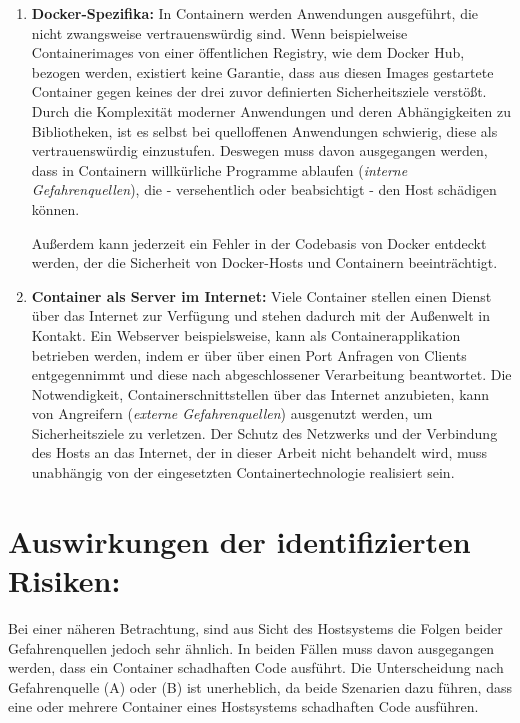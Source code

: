 \documentclass[../main.tex]{subfiles}
\begin{document}
    \begin{enumerate}[label=(\Alph*)]
      \item \textbf{Docker-Spezifika:} In Containern werden Anwendungen ausgeführt, die nicht zwangsweise vertrauenswürdig sind. Wenn beispielweise Containerimages von einer öffentlichen Registry, wie dem Docker Hub, bezogen werden, existiert keine Garantie, dass aus diesen Images gestartete Container gegen keines der drei zuvor definierten Sicherheitsziele verstößt. Durch die Komplexität moderner Anwendungen und deren Abhängigkeiten zu Bibliotheken, ist es selbst bei quelloffenen Anwendungen schwierig, diese als vertrauenswürdig einzustufen. Deswegen muss davon ausgegangen werden, dass in Containern willkürliche Programme ablaufen (\emph{interne Gefahrenquellen}), die - versehentlich oder beabsichtigt - den Host schädigen können.

      Außerdem kann jederzeit ein Fehler in der Codebasis von Docker entdeckt werden, der die Sicherheit von Docker-Hosts und Containern beeinträchtigt.

      \item \textbf{Container als Server im Internet:} Viele Container stellen einen Dienst über das Internet zur Verfügung und stehen dadurch mit der Außenwelt in Kontakt. Ein Webserver beispielsweise, kann als Containerapplikation betrieben werden, indem er über über einen Port Anfragen von Clients entgegennimmt und diese nach abgeschlossener Verarbeitung beantwortet. Die Notwendigkeit, Containerschnittstellen über das Internet anzubieten, kann von Angreifern (\emph{externe Gefahrenquellen}) ausgenutzt werden, um Sicherheitsziele zu verletzen. Der Schutz des Netzwerks und der Verbindung des Hosts an das Internet, der in dieser Arbeit nicht behandelt wird, muss unabhängig von der eingesetzten Containertechnologie realisiert sein.
    \end{enumerate}

  \section{Auswirkungen der identifizierten Risiken:}
    Bei einer näheren Betrachtung, sind aus Sicht des Hostsystems die Folgen beider Gefahrenquellen jedoch sehr ähnlich. In beiden Fällen muss davon ausgegangen werden, dass ein Container schadhaften Code ausführt. Die Unterscheidung nach Gefahrenquelle (A) oder (B) ist unerheblich, da beide Szenarien dazu führen, dass eine oder mehrere Container eines Hostsystems schadhaften Code ausführen.
\end{document}
